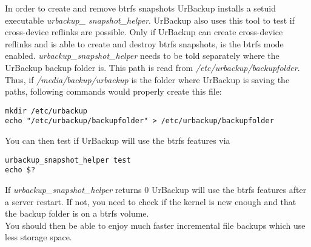 \documentclass[a4paper,10pt]{article}
\begin{document}
\noindent In order to create and remove btrfs snapshots UrBackup installs a setuid
executable \textsl{urbackup\_ snapshot\_helper}. UrBackup also uses this tool to
test if cross-device reflinks are possible. Only if UrBackup can create
cross-device reflinks and is able to create and destroy btrfs snapshots, is the
btrfs mode enabled. \textsl{urbackup\_snapshot\_helper} needs to be told separately
where the UrBackup backup folder is. This path is read from \textsl{/etc/urbackup/backupfolder}.
Thus, if \textsl{/media/backup/urbackup} is the folder where UrBackup is saving
the paths, following commands would properly create this file:
\begin{verbatim}
mkdir /etc/urbackup
echo "/etc/urbackup/backupfolder" > /etc/urbackup/backupfolder
\end{verbatim}
You can then test if UrBackup will use the btrfs features via
\begin{verbatim}
urbackup_snapshot_helper test
echo $?
\end{verbatim}
If \textsl{urbackup\_snapshot\_helper} returns $0$ UrBackup will use the btrfs features
after a server restart. If not, you need to check if the kernel is new enough and
that the backup folder is on a btrfs volume.\\

\noindent You should then be able to enjoy much faster incremental file backups which use less storage space.
\end{document}
